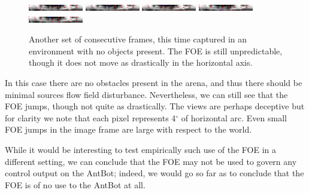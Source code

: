 \documentclass[a4paper,11pt,twoside,openright]{article}
\begin{document}
\begin{figure}[h!]
  \centering
  \includegraphics[width=\textwidth]{frame_00064}
  \includegraphics[width=\textwidth]{frame_00065}
  \includegraphics[width=\textwidth]{frame_00066}
  \includegraphics[width=\textwidth]{frame_00067}
  \includegraphics[width=\textwidth]{frame_00068}
  \caption{\label{fig:foeframesempty} Another set of consecutive
    frames, this time captured in an environment with no objects
    present. The FOE is still unpredictable, though it does not move
    as drastically in the horizontal axis.
  }
\end{figure}

In this case there are no obstacles present in the arena, and thus
there should be minimal sources flow field disturbance. Nevertheless,
we can still see that the FOE jumps, though not quite as drastically.
The views are perhaps deceptive but for clarity we note that each
pixel represents 4$^\circ$ of horizontal arc. Even small FOE jumps in
the image frame are large with respect to the world.\newline\par

While it would be interesting to test empirically such use of the FOE
in a different setting, we can conclude that the FOE may not be used
to govern any control output on the AntBot; indeed, we would go so far
as to conclude that the FOE is of no use to the AntBot at all.
\newline\par
\end{document}
